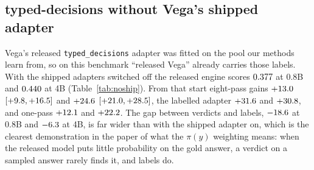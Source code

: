 \subsection{typed-decisions without Vega's shipped adapter}
\label{sec:noship}

Vega's released \texttt{typed\_decisions} adapter was fitted on the pool our methods learn from, so on this benchmark ``released Vega'' already carries those labels. With the shipped adapters switched off the released engine scores $0.377$ at 0.8B and $0.440$ at 4B (Table~\ref{tab:noship}). From that start eight-pass \pk{} gains $+13.0$ $[+9.8, +16.5]$ and $+24.6$ $[+21.0, +28.5]$, the labelled adapter $+31.6$ and $+30.8$, and one-pass \pk{} $+12.1$ and $+22.2$. The gap between verdicts and labels, $-18.6$ at 0.8B and $-6.3$ at 4B, is far wider than with the shipped adapter on, which is the clearest demonstration in the paper of what the $\pi(y)$ weighting means: when the released model puts little probability on the gold answer, a verdict on a sampled answer rarely finds it, and labels do.
